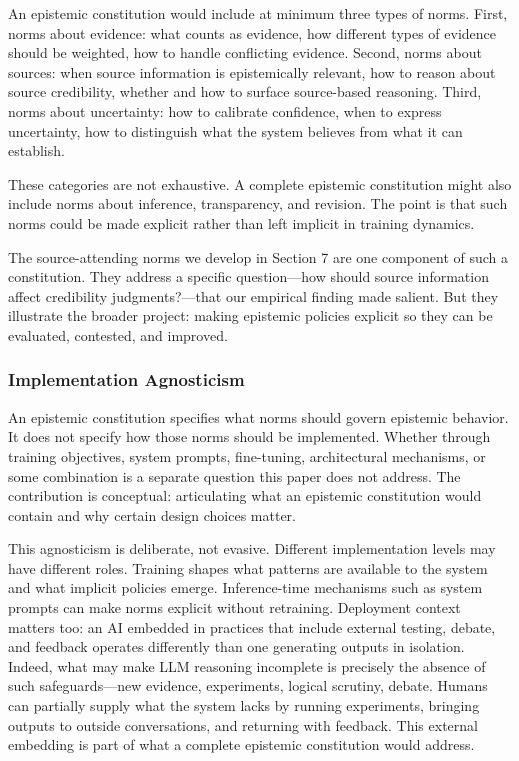 An epistemic constitution would include at minimum three types of norms.
First, norms about evidence: what counts as evidence, how different
types of evidence should be weighted, how to handle conflicting
evidence. Second, norms about sources: when source information is
epistemically relevant, how to reason about source credibility, whether
and how to surface source-based reasoning. Third, norms about
uncertainty: how to calibrate confidence, when to express uncertainty,
how to distinguish what the system believes from what it can establish.

These categories are not exhaustive. A complete epistemic constitution
might also include norms about inference, transparency, and revision.
The point is that such norms could be made explicit rather than left
implicit in training dynamics.

The source-attending norms we develop in Section 7 are one component of
such a constitution. They address a specific question---how should
source information affect credibility judgments?---that our empirical
finding made salient. But they illustrate the broader project: making
epistemic policies explicit so they can be evaluated, contested, and
improved.

\subsubsection{Implementation
Agnosticism}\label{implementation-agnosticism}

An epistemic constitution specifies what norms should govern epistemic
behavior. It does not specify how those norms should be implemented.
Whether through training objectives, system prompts, fine-tuning,
architectural mechanisms, or some combination is a separate question
this paper does not address. The contribution is conceptual:
articulating what an epistemic constitution would contain and why
certain design choices matter.

This agnosticism is deliberate, not evasive. Different implementation
levels may have different roles. Training shapes what patterns are
available to the system and what implicit policies emerge.
Inference-time mechanisms such as system prompts can make norms explicit
without retraining. Deployment context matters too: an AI embedded in
practices that include external testing, debate, and feedback operates
differently than one generating outputs in isolation. Indeed, what may
make LLM reasoning incomplete is precisely the absence of such
safeguards---new evidence, experiments, logical scrutiny, debate. Humans
can partially supply what the system lacks by running experiments,
bringing outputs to outside conversations, and returning with feedback.
This external embedding is part of what a complete epistemic
constitution would address.

